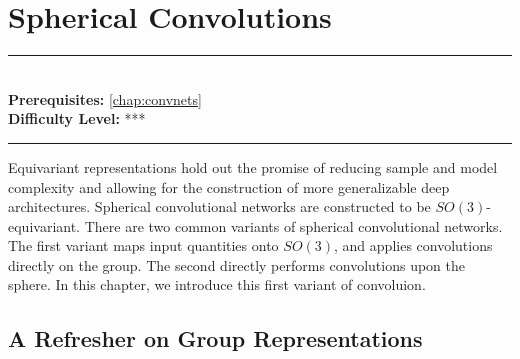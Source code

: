 \documentclass[book.tex]{subfiles}
\begin{document}
\chapter{Spherical Convolutions}

\label{chap:spherical_cnn}
\noindent\rule{11cm}{0.4pt} \\
\textbf{Prerequisites:}  \autoref{chap:convnets} \\
\textbf{Difficulty Level:} *** \\
\noindent\rule{11cm}{0.4pt}
\vspace{5mm}


Equivariant representations hold out the promise of reducing sample and model complexity and allowing for the construction of more generalizable deep architectures. Spherical convolutional networks are constructed to be $SO(3)$-equivariant. There are two common variants of spherical convolutional networks. The first variant maps input quantities onto $SO(3)$, and applies convolutions directly on the group. The second directly performs convolutions upon the sphere. In this chapter, we introduce this first variant of convoluion. %

\section{A Refresher on Group Representations}
\end{document}
